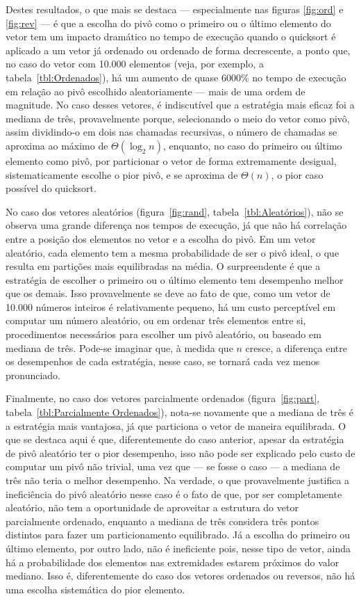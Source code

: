 \documentclass[10pt,oneside,onecolumn]{article}
\begin{document}
Destes resultados, o que mais se destaca --- especialmente nas figuras
\ref{fig:ord} e \ref{fig:rev} --- é que a escolha do pivô como o primeiro ou o
último elemento do vetor tem um impacto dramático no tempo de execução quando o
quicksort é aplicado a um vetor já ordenado ou ordenado de forma decrescente, a
ponto que, no caso do vetor com 10.000 elementos (veja, por exemplo, a
tabela~\ref{tbl:Ordenados}), há um aumento de quase 6000\% no tempo de execução
em relação ao pivô escolhido aleatoriamente --- mais de uma ordem de magnitude.
No caso desses vetores, é indiscutível que a estratégia mais eficaz foi a
mediana de três, provavelmente porque, selecionando o meio do vetor como pivô,
assim dividindo-o em dois nas chamadas recursivas, o número de chamadas se
aproxima ao máximo de $\Theta(\log_2 n)$, enquanto, no caso do primeiro ou
último elemento como pivô, por particionar o vetor de forma extremamente
desigual, sistematicamente escolhe o pior pivô, e se aproxima de $\Theta(n)$, o
pior caso possível do quicksort.

No caso dos vetores aleatórios (figura~\ref{fig:rand},
tabela~\ref{tbl:Aleatórios}), não se observa uma grande diferença nos tempos de
execução, já que não há correlação entre a posição dos elementos no vetor e a
escolha do pivô. Em um vetor aleatório, cada elemento tem a mesma probabilidade
de ser o pivô ideal, o que resulta em partições mais equilibradas na média. O
surpreendente é que a estratégia de escolher o primeiro ou o último elemento
tem desempenho melhor que os demais. Isso provavelmente se deve ao fato de que,
como um vetor de 10.000 números inteiros é relativamente pequeno, há um custo
perceptível em computar um número aleatório, ou em ordenar três elementos entre
si, procedimentos necessários para escolher um pivô aleatório, ou baseado em
mediana de três. Pode-se imaginar que, à medida que $n$ cresce, a diferença
entre os desempenhos de cada estratégia, nesse caso, se tornará cada vez menos
pronunciado.

Finalmente, no caso dos vetores parcialmente ordenados (figura~\ref{fig:part},
tabela~\ref{tbl:Parcialmente Ordenados}), nota-se novamente que a mediana de
três é a estratégia mais vantajosa, já que particiona o vetor de maneira
equilibrada. O que se destaca aqui é que, diferentemente do caso anterior,
apesar da estratégia de pivô aleatório ter o pior desempenho, isso não pode ser
explicado pelo custo de computar um pivô não trivial, uma vez que --- se fosse
o caso --- a mediana de três não teria o melhor desempenho. Na verdade, o que
provavelmente justifica a ineficiência do pivô aleatório nesse caso é o fato de
que, por ser completamente aleatório, não tem a oportunidade de aproveitar a
estrutura do vetor parcialmente ordenado, enquanto a mediana de três considera
três pontos distintos para fazer um particionamento equilibrado. Já a escolha
do primeiro ou último elemento, por outro lado, não é ineficiente pois, nesse
tipo de vetor, ainda há a probabilidade dos elementos nas extremidades estarem
próximos do valor mediano. Isso é, diferentemente do caso dos vetores ordenados
ou reversos, não há uma escolha sistemática do pior elemento.
\end{document}
